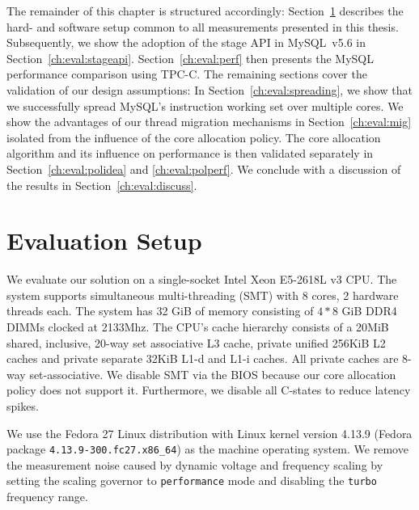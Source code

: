 \documentclass[12pt,a4paper]{book}
\begin{document}
The remainder of this chapter is structured accordingly:
Section~\ref{ch:eval:setup} describes the hard- and software setup common to all measurements presented in this thesis.
Subsequently, we show the adoption of the stage API in MySQL~v5.6 in Section~\ref{ch:eval:stageapi}.
Section~\ref{ch:eval:perf} then presents the MySQL performance comparison using TPC-C.
The remaining sections cover the validation of our design assumptions:
In Section~\ref{ch:eval:spreading}, we show that we successfully spread MySQL's instruction working set over multiple cores.
We show the advantages of our thread migration mechanisms in Section~\ref{ch:eval:mig} isolated from the influence of the core allocation policy.
The core allocation algorithm and its influence on performance is then validated separately in Section~\ref{ch:eval:polidea} and \ref{ch:eval:polperf}.
We conclude with a discussion of the results in Section~\ref{ch:eval:discuss}.

\clearpage
\section{Evaluation Setup}\label{ch:eval:setup}
% 




We evaluate our solution on a single-socket Intel Xeon E5-2618L v3 CPU.
The system supports simultaneous multi-threading (SMT) with 8 cores, 2 hardware threads each.
The system has 32 GiB of memory consisting of $4*8$ GiB DDR4 DIMMs clocked at 2133Mhz.
The CPU's cache hierarchy consists of a 20MiB shared, inclusive, 20-way set associative L3 cache, private unified 256KiB L2 caches and private separate 32KiB L1-d and L1-i caches.
All private caches are 8-way set-associative.
We disable SMT via the BIOS because our core allocation policy does not support it. 
Furthermore, we disable all C-states to reduce latency spikes.

We use the Fedora 27 Linux distribution with Linux kernel version 4.13.9 (Fedora package \lstinline[style=figurecpp]{4.13.9-300.fc27.x86_64}) as the machine operating system.
We remove the measurement noise caused by dynamic voltage and frequency scaling by setting the scaling governor to \lstinline[style=figurecpp]{performance} mode and disabling the \lstinline[style=figurecpp]{turbo} frequency range.
\end{document}
